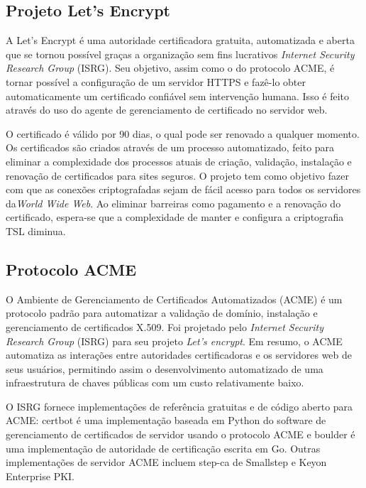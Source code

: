 \documentclass[
    openany,
    12pt,               %
    twoside,            %
    a4paper,            %
    english,            %
    brazil,             %
    ]{abntex2}
\begin{document}
\subsection{Projeto Let's Encrypt}
\label{cap:lets-encrypt}

A Let's Encrypt é uma autoridade certificadora gratuita, automatizada e aberta que se tornou possível graças a organização sem fins lucrativos \textit{Internet Security Research Group} (ISRG). Seu objetivo, assim como o do protocolo ACME, é tornar possível a configuração de um servidor HTTPS e fazê-lo obter automaticamente um certificado confiável sem intervenção humana. Isso é feito através do uso do agente de gerenciamento de certificado no servidor web.

O certificado é válido por 90 dias, o qual pode ser renovado a qualquer momento. Os certificados são criados através de um processo automatizado, feito  para eliminar a complexidade dos processos atuais de criação, validação, instalação e renovação de certificados para sites seguros. O projeto tem como objetivo fazer com que as conexões criptografadas sejam de fácil acesso para todos os servidores da\textit{World Wide Web}. Ao eliminar barreiras como pagamento e a renovação do certificado, espera-se que a complexidade de manter e configura a criptografia TSL diminua.

\subsection{Protocolo ACME}
\label{cap:prot-acme}

O Ambiente de Gerenciamento de Certificados Automatizados (ACME) é um protocolo padrão para automatizar a validação de domínio, instalação e gerenciamento de certificados X.509. Foi projetado pelo \textit{Internet Security Research Group} (ISRG) para seu projeto \textit{Let's encrypt}. Em resumo, o ACME automatiza as interações entre autoridades certificadoras e os servidores web de seus usuários, permitindo assim o desenvolvimento automatizado de uma infraestrutura de chaves públicas com um custo relativamente baixo.

O ISRG fornece implementações de referência gratuitas e de código aberto para ACME: certbot é uma implementação baseada em Python do software de gerenciamento de certificados de servidor usando o protocolo ACME e boulder é uma implementação de autoridade de certificação escrita em Go. Outras implementações de servidor ACME incluem step-ca de Smallstep e Keyon Enterprise PKI.
\end{document}
